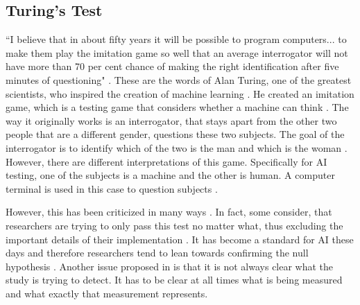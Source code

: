 \documentclass[journal]{IEEEtran}
\begin{document}
\subsection{Turing's Test}
``I believe that in about fifty years it will be possible to program computers... to make them play the imitation game so well that an average interrogator will not have more than 70 per cent chance of making the right identification after five minutes of questioning" \cite{alan59turing}. These are the words of Alan Turing, one of the greatest scientists, who inspired the creation of machine learning \cite{hayes1995turing}. He created an imitation game, which is a testing game that considers whether a machine can think \cite{alan59turing}. The way it originally works is an interrogator, that stays apart from the other two people that are a different gender, questions these two subjects. The goal of the interrogator is to identify which of the two is the man and which is the woman \cite{alan59turing}. However, there are different interpretations of this game. Specifically for AI testing, one of the subjects is a machine and the other is human. A computer terminal is used in this case to question subjects \cite{livingstone2006turing}. %

However, this has been criticized in many ways \cite{hayes1995turing}\cite{sweeney2003s}\cite{crockett1994turing}\cite{livingstone2006turing}. In fact, some consider, that researchers are trying to only pass this test no matter what, thus excluding the important details of their implementation \cite{hayes1995turing}. It has become a standard for AI these days and therefore researchers tend to lean towards confirming the null hypothesis \cite{hayes1995turing}. Another issue proposed in \cite{hayes1995turing} is that it is not always clear what the study is trying to detect. It has to be clear at all times what is being measured and what exactly that measurement represents. %
\end{document}
